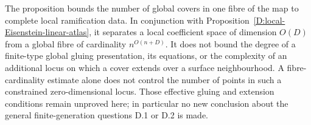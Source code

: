 \begin{remark}
The proposition bounds the number of global covers in one fibre of
the map to complete local ramification data. In conjunction with
Proposition~\ref{D:local-Eisenstein-linear-atlas}, it separates a
local coefficient space of dimension $O(D)$ from a global fibre
of cardinality $n^{O(n+D)}$. It does not bound the degree of a
finite-type global gluing presentation, its equations, or the
complexity of an additional locus on which a cover extends over
a surface neighbourhood. A fibre-cardinality estimate alone
does not control the number of points in such a constrained
zero-dimensional locus. Those effective gluing and extension
conditions remain unproved here; in particular no new conclusion
about the general finite-generation questions D.1 or D.2 is made.
\end{remark}
